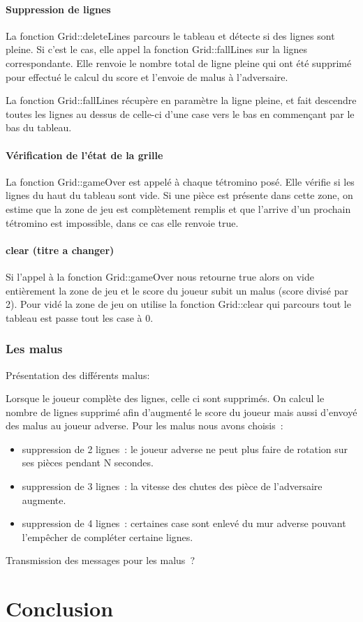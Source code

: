 \documentclass[a4paper, 12pt]{article}
\begin{document}
			\paragraph{Suppression de lignes}
			La fonction Grid::deleteLines parcours le tableau et détecte si des lignes sont pleine.
			Si c’est le cas, elle appel la fonction Grid::fallLines sur la lignes correspondante.
			Elle renvoie le nombre total de ligne pleine qui ont été supprimé pour effectué le calcul du score et l’envoie de malus à l’adversaire.

			La fonction Grid::fallLines récupère en paramètre la ligne pleine, et fait descendre toutes les lignes au dessus de celle-ci d’une case vers le bas en commençant par le bas du tableau.

			\paragraph{Vérification de l’état de la grille}

			La fonction Grid::gameOver est appelé à chaque tétromino posé. Elle vérifie si les lignes du haut du tableau sont vide. Si une pièce est présente dans cette zone, on estime que la zone de jeu est complètement remplis et que l’arrive d’un prochain tétromino est impossible, dans ce cas elle renvoie true.

			\paragraph{clear (titre a changer)}

			Si l’appel à la fonction Grid::gameOver nous retourne true alors on vide entièrement la zone de jeu et le score du joueur subit un malus (score divisé par 2). 
			Pour vidé la zone de jeu on utilise la fonction Grid::clear qui parcours tout le tableau est passe tout les case à 0.

		\subsubsection{Les malus}


			Présentation des différents malus:

			Lorsque le joueur complète des lignes, celle ci sont supprimés. On calcul le nombre de lignes supprimé afin d’augmenté le score du joueur mais aussi d’envoyé des malus au joueur adverse.
			Pour les malus nous avons choisis : 

			\begin{itemize}
				\item suppression de 2 lignes : le joueur adverse ne peut plus faire de rotation sur ses pièces pendant N secondes.
				\item suppression de 3 lignes : la vitesse des chutes des pièce de l’adversaire augmente.
				\item suppression de 4 lignes : certaines case sont enlevé du mur adverse pouvant l’empêcher de compléter certaine lignes.
			\end{itemize}

			Transmission des messages pour les malus ?

\section*{Conclusion}
\end{document}
